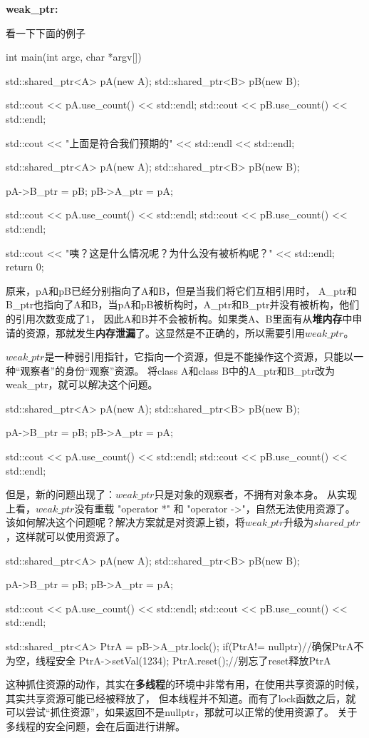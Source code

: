 \textbf{weak\_ptr:}

看一下下面的例子

\begin{tcode}
int main(int argc, char *argv[]) {
{
    std::shared_ptr<A> pA(new A);
    std::shared_ptr<B> pB(new B);

    std::cout << pA.use_count() << std::endl;
    std::cout << pB.use_count() << std::endl;
}
std::cout << "上面是符合我们预期的" << std::endl << std::endl;
{
    std::shared_ptr<A> pA(new A);
    std::shared_ptr<B> pB(new B);

    pA->B_ptr = pB;
    pB->A_ptr = pA;

    std::cout << pA.use_count() << std::endl;
    std::cout << pB.use_count() << std::endl;
}
std::cout << "咦？这是什么情况呢？为什么没有被析构呢？" << std::endl;
return 0;
}
\end{tcode}
原来，pA和pB已经分别指向了A和B，但是当我们将它们互相引用时，
A\_ptr和B\_ptr也指向了A和B，当pA和pB被析构时，A\_ptr和B\_ptr并没有被析构，他们的引用次数变成了1，
因此A和B并不会被析构。如果类A、B里面有从\textbf{堆内存}中申请的资源，那就发生\textbf{内存泄漏}了。这显然是不正确的，所以需要引用$weak\_ptr$。

$weak\_ptr$是一种弱引用指针，它指向一个资源，但是不能操作这个资源，只能以一种“观察者”的身份“观察”资源。
将class A和class B中的A\_ptr和B\_ptr改为weak\_ptr，就可以解决这个问题。

\begin{tcode}
{
    std::shared_ptr<A> pA(new A);
    std::shared_ptr<B> pB(new B);

    pA->B_ptr = pB;
    pB->A_ptr = pA;

    std::cout << pA.use_count() << std::endl;
    std::cout << pB.use_count() << std::endl;
}
\end{tcode}
但是，新的问题出现了：$weak\_ptr$只是对象的观察者，不拥有对象本身。
从实现上看，$weak\_ptr$没有重载 "operator *" 和 "operator ->"，自然无法使用资源了。
该如何解决这个问题呢？解决方案就是对资源上锁，将$weak\_ptr$升级为$shared\_ptr$，这样就可以使用资源了。

\begin{tcode}
{
    std::shared_ptr<A> pA(new A);
    std::shared_ptr<B> pB(new B);

    pA->B_ptr = pB;
    pB->A_ptr = pA;

    std::cout << pA.use_count() << std::endl;
    std::cout << pB.use_count() << std::endl;

    std::shared_ptr<A> PtrA = pB->A_ptr.lock();
    if(PtrA!= nullptr)//确保PtrA不为空，线程安全
        PtrA->setVal(1234);
    PtrA.reset();//别忘了reset释放PtrA
}
\end{tcode}
这种抓住资源的动作，其实在\textbf{多线程}的环境中非常有用，在使用共享资源的时候，其实共享资源可能已经被释放了，
但本线程并不知道。而有了lock函数之后，就可以尝试“抓住资源”，如果返回不是nullptr，那就可以正常的使用资源了。
关于多线程的安全问题，会在后面进行讲解。

